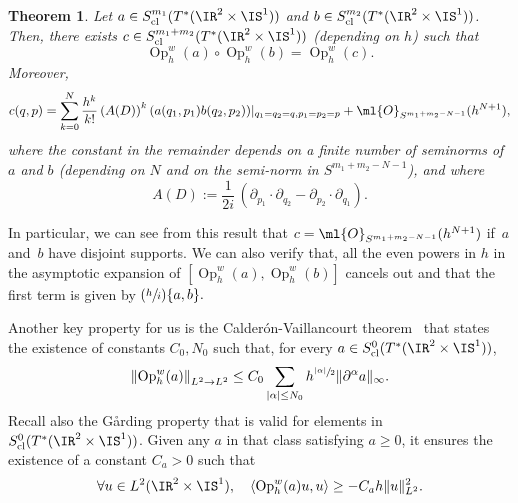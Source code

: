 \documentclass[10pt]{amsart}
\newcommand{\Psfrac}[2]{(\sfrac{#1}{#2})}
\theoremstyle{plain}
\newtheorem{theo}{Theorem}[section]
\theoremstyle{definition}
\theoremstyle{remark}
\newcommand{\Op}{\operatorname{Op}}
\begin{document}
\begin{theo}\label{t:composition}
Let $a\in S^{m_1}_{\textup{cl}}(T^*(\IR^2\times\IS^1))$ and $b\in S^{m_2}_{\textup{cl}}(T^*(\IR^2\times\IS^1))$. Then, there exists $c\in S^{m_1+m_2}_{\textup{cl}}(T^*(\IR^2\times\IS^1))$ (depending on $h$) such that\vspace*{-3pt}
\begin{equation}\label{e:composition-formula}\Op_h^w(a)\circ\Op_h^w(b)=\Op_h^w(c).\end{equation}
Moreover,\vspace*{-5pt}\enlargethispage{\baselineskip}
\[
c(q,p)=\sum_{k=0}^N\frac{h^k}{k!}\left(A(D)\right)^k(a(q_1,p_1)b(q_2,p_2))|_{q_1=q_2=q, p_1=p_2=p}+\ml{O}_{S^{m_1+m_2-N-1}}(h^{N+1}),
\]
where the constant in the remainder depends on a finite number of seminorms of $a$ and $b$ (depending on $N$ and on the semi-norm in $S^{m_1+m_2-N-1}$), and where\vspace*{-3pt}
\[
A(D):=\frac{1}{2i}\,(\partial_{p_1}\cdot\partial_{q_2}-\partial_{p_2}\cdot\partial_{q_1}).
\]
\end{theo}
In particular, we can see from this result that $c=\ml{O}_{S^{m_1+m_2-N-1}}(h^{N+1})$ if~$a$ and~$b$ have disjoint supports. We can also verify that, all the even powers in $h$ in the asymp\-totic expansion of $[\Op_h^w(a),\Op_h^w(b)]$ cancels out and that the first term is given by $\Psfrac{h}{i}\{a,b\}.$

Another key property for us is the Calderón-Vaillancourt theorem~\cite[Ch.\,5]{Zworski12} that states the existence of constants $C_0, N_0$ such that, for every $a\in S^{0}_{\textup{cl}}(T^*(\IR^2\times\IS^1))$,\vspace*{-3pt}
\begin{equation}\label{e:calderon}
\left\|\Op_h^w(a)\right\|_{L^2\to L^2}\leq C_0\sum_{|\alpha|\leq N_0}h^{\sfrac{|\alpha|}{2}}\|\partial^\alpha a\|_{\infty}.
\end{equation}
Recall also the G\aa rding property that is valid for elements in $S^{0}_{\textup{cl}}(T^*(\IR^2\times\IS^1))$. Given any $a$ in that class satisfying $a\geq 0$, it ensures the existence of a constant $C_a>0$ \cite[Th.\,4.32]{Zworski12} such that\vspace*{-3pt}
\begin{equation}\label{e:Garding0}\forall u\in L^2(\IR^2\times\IS^1),\quad\langle \Op_h^w(a)u,u\rangle\geq -C_a h\|u\|_{L^2}^2.
\end{equation}
\end{document}
